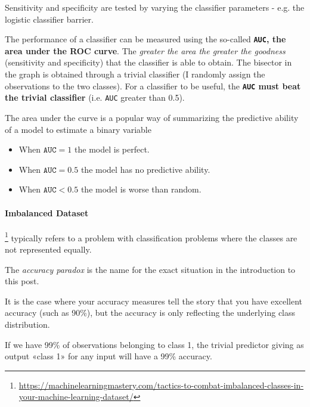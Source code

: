 Sensitivity and specificity are tested by varying the classifier parameters - e.g. the logistic classifier barrier.


The performance of a classifier can be measured using the so-called \textbf{\texttt{AUC}, the area under the ROC curve}. The \textit{greater the area the greater the goodness} (sensitivity and specificity) that the classifier is able to obtain. The bisector in the graph is obtained through a trivial classifier (I randomly assign the observations to the two classes). For a classifier to be useful, the \textbf{\texttt{AUC} must beat the trivial classifier} (i.e. \texttt{AUC} greater than 0.5).

The area under the curve is a popular way of summarizing the predictive ability of a model to estimate a binary variable
\begin{itemize}
    \item When $\texttt{AUC} = 1$ the model is perfect. 
    \item When $\texttt{AUC} = 0.5$ the model has no predictive ability.
    \item When $\texttt{AUC} < 0.5$ the model is worse than random.
\end{itemize}

\paragraph{Imbalanced Dataset}\footnote{\url{https://machinelearningmastery.com/tactics-to-combat-imbalanced-classes-in-your-machine-learning-dataset/}} typically refers to a problem with classification problems where the classes are not represented equally.

The \textit{accuracy paradox} is the name for the exact situation in the introduction to this post.

It is the case where your accuracy measures tell the story that you have excellent accuracy (such as 90\%), but the accuracy is only reflecting the underlying class distribution.

If we have 99\% of observations belonging to class 1, the trivial predictor giving as output «class 1» for any input will have a 99\% accuracy.

